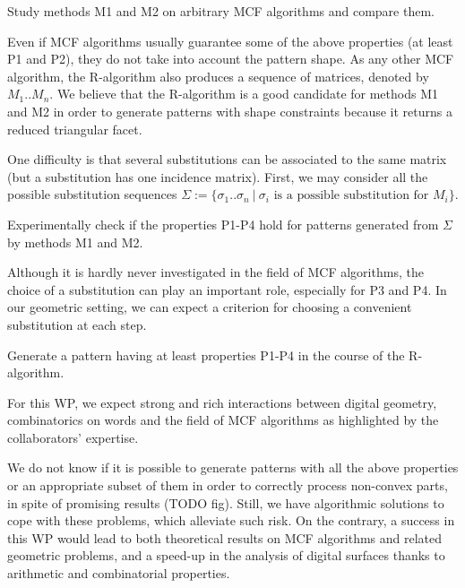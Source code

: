 \begin{Task}
  \label{task:genmeth}
  Study methods M1 and M2 on arbitrary MCF algorithms and compare them.   
\end{Task}

Even if MCF algorithms usually guarantee some of the above properties (at least P1 and P2),
they do not take into account the pattern shape. As any other MCF algorithm, the R-algorithm
also produces a sequence of matrices, denoted by $M_1..M_n$. We believe that the R-algorithm
is a good candidate for methods M1 and M2 in order to generate patterns with shape
constraints because it returns a reduced triangular facet.

One difficulty is that several substitutions can be associated to the same matrix
(but a substitution has one incidence matrix). First, we may consider all the possible
substitution sequences
$\Sigma := \{ \sigma_1..\sigma_n \ | \ \sigma_i \text{ is a possible substitution for } M_i \}$.

\begin{Task}
  \label{task:genexp}
  Experimentally check if the properties P1-P4 hold for patterns generated from $\Sigma$
  by methods M1 and M2.  
\end{Task}

Although it is hardly never investigated in the field of MCF algorithms, the choice of a
substitution can play an important role, especially for P3 and P4. In our geometric setting,
we can expect a criterion for choosing a convenient substitution at each step. 

\begin{Task}
  \label{task:genpat}
  Generate a pattern having at least properties P1-P4 in the course of the R-algorithm. 
\end{Task}

For this WP, we expect strong and rich interactions between digital geometry, combinatorics on words
and the field of MCF algorithms as highlighted by the collaborators' expertise.

\Risks
We do not know if it is possible to generate patterns with all the above properties
or an appropriate subset of them in order to correctly process non-convex parts,
in spite of promising results (TODO fig). Still, we have algorithmic solutions
\cite{LPRJMIV2017} to cope with these problems, which alleviate such risk. 
On the contrary, a success in this WP would lead to both theoretical results
on MCF algorithms and related geometric problems, and a speed-up in the analysis
of digital surfaces thanks to arithmetic and combinatorial properties.  

